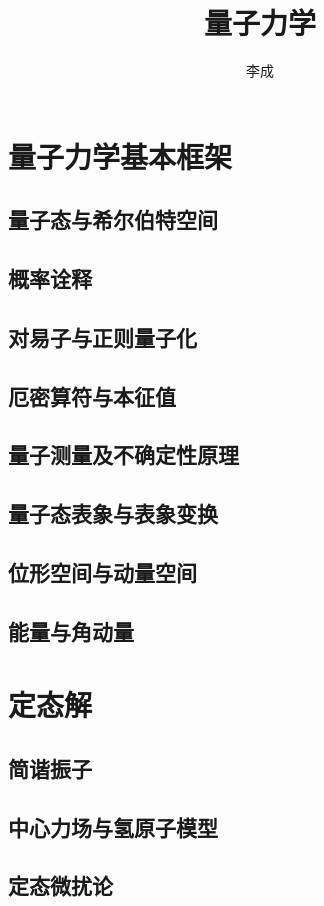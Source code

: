 \documentclass[a4paper]{report}
\author{李成}
\title{\textbf{{\Huge 量子力学}}}
\begin{document}
\maketitle
\tableofcontents


\chapter{量子力学基本框架}
\section{量子态与希尔伯特空间}
\section{概率诠释}
\section{对易子与正则量子化}
\section{厄密算符与本征值}
\section{量子测量及不确定性原理}
\section{量子态表象与表象变换}
\section{位形空间与动量空间}
\section{能量与角动量}

\chapter{定态解}
\section{简谐振子}
\section{中心力场与氢原子模型}
\section{定态微扰论}
\end{document}
